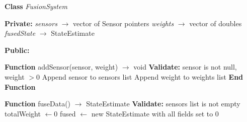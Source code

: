 \documentclass[a4paper,11pt]{article}
\begin{document}
\begin{algorithm}[H]
\caption{FusionSystem::fuseData   Weighted-Average Sensor Fusion}
\begin{algorithmic}[1]

\State \textbf{Class} \textit{FusionSystem}

\State \hspace{0.5cm} \textbf{Private:}
\State \hspace{1cm} \textit{sensors} $\rightarrow$ vector of Sensor pointers
\State \hspace{1cm} \textit{weights} $\rightarrow$ vector of doubles
\State \hspace{1cm} \textit{fusedState} $\rightarrow$ StateEstimate

\State \hspace{0.5cm} \textbf{Public:}

\State \hspace{1cm} \textbf{Function} addSensor(sensor, weight) $\rightarrow$ void
\State \hspace{1.5cm} \textbf{Validate:} sensor is not null, weight $> 0$
\State \hspace{1.5cm} Append sensor to sensors list
\State \hspace{1.5cm} Append weight to weights list
\State \hspace{1cm} \textbf{End Function}

\vspace{0.2cm}
\State \hspace{1cm} \textbf{Function} fuseData() $\rightarrow$ StateEstimate
\State \hspace{1.5cm} \textbf{Validate:} sensors list is not empty
\State \hspace{1.5cm} totalWeight $\leftarrow 0$
\State \hspace{1.5cm} fused $\leftarrow$ new StateEstimate with all fields set to 0


\end{algorithmic}
\end{algorithm}
\end{document}
